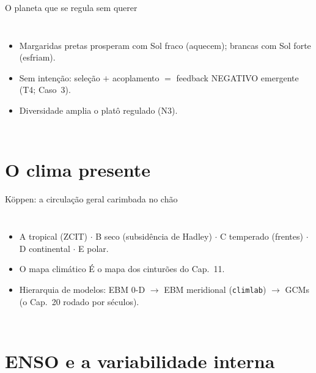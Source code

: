 \documentclass[aspectratio=169,11pt]{beamer}
\begin{document}
\begin{frame}{O planeta que se regula sem querer}
  \begin{columns}
    \begin{itemize}
      \item Margaridas pretas prosperam com Sol fraco (aquecem);
            brancas com Sol forte (esfriam).
      \item Sem intenção: seleção $+$ acoplamento $=$ feedback
            NEGATIVO emergente (T4; Caso~3).
      \item Diversidade amplia o platô regulado (N3).
    \end{itemize}
  \end{columns}
\end{frame}

\section{O clima presente}

\begin{frame}{Köppen: a circulação geral carimbada no chão}
  \begin{columns}
    \begin{itemize}
      \item A tropical (ZCIT) $\cdot$ B seco (subsidência de Hadley)
            $\cdot$ C temperado (frentes) $\cdot$ D continental
            $\cdot$ E polar.
      \item O mapa climático É o mapa dos cinturões do Cap.~11.
      \item Hierarquia de modelos: EBM 0-D $\to$ EBM meridional
            (\texttt{climlab}) $\to$ GCMs (o Cap.~20 rodado por
            séculos).
    \end{itemize}
  \end{columns}
\end{frame}

\section{ENSO e a variabilidade interna}
\end{document}
